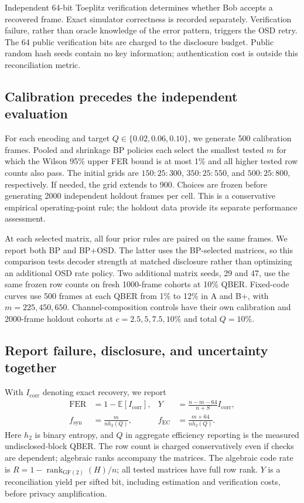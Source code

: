 Independent 64-bit Toeplitz verification determines whether Bob accepts a recovered frame.
Exact simulator correctness is recorded separately. Verification failure, rather than oracle
knowledge of the error pattern, triggers the OSD retry. The 64 public verification bits
are charged to the disclosure budget. Public random hash seeds contain no key information;
authentication cost is outside this reconciliation metric.

\subsection{Calibration precedes the independent evaluation}
For each encoding and target $Q\in\{0.02,0.06,0.10\}$, we generate 500 calibration frames.
Pooled and shrinkage BP policies each select the smallest tested $m$ for which the Wilson
95\% upper FER bound is at most 1\% and all higher tested row counts also pass. The initial
grids are $150{:}25{:}300$, $350{:}25{:}550$, and $500{:}25{:}800$, respectively.
If needed, the grid extends to 900. Choices are frozen before generating 2000 independent
holdout frames per cell. This is a conservative empirical operating-point rule; the
holdout data provide its separate performance assessment.

At each selected matrix, all four prior rules are paired on the same frames. We report both
BP and BP+OSD. The latter uses the BP-selected matrices, so this comparison tests decoder
strength at matched disclosure rather than optimizing an additional OSD rate policy.
Two additional matrix seeds, 29 and 47, use the same frozen row counts on fresh 1000-frame
cohorts at 10\% QBER. Fixed-code curves use 500 frames at each QBER from 1\% to 12\% in
A and B+, with $m=225,450,650$. Channel-composition controls have their own calibration
and 2000-frame holdout cohorts at $c=2.5,5,7.5,10\%$ and total $Q=10\%$.

\subsection{Report failure, disclosure, and uncertainty together}
With $I_{\mathrm{corr}}$ denoting exact recovery, we report
\begin{align}
 \mathrm{FER}&=1-\mathbb E[I_{\mathrm{corr}}], &
 Y&=\frac{n-m-64}{n+S}I_{\mathrm{corr}}, \label{eq:yield}\\
 f_{\mathrm{syn}}&=\frac{m}{n h_2(Q)}, &
 f_{\mathrm{EC}}&=\frac{m+64}{n h_2(Q)}. \label{eq:efficiency}
\end{align}
Here $h_2$ is binary entropy, and $Q$ in aggregate efficiency reporting is the measured
undisclosed-block QBER. The row count is charged conservatively even if checks are
dependent; algebraic ranks accompany the matrices. The algebraic code rate is
$R=1-\operatorname{rank}_{\mathrm{GF}(2)}(H)/n$; all tested matrices have full row rank.
$Y$ is a reconciliation yield per
sifted bit, including estimation and verification costs, before privacy amplification.

